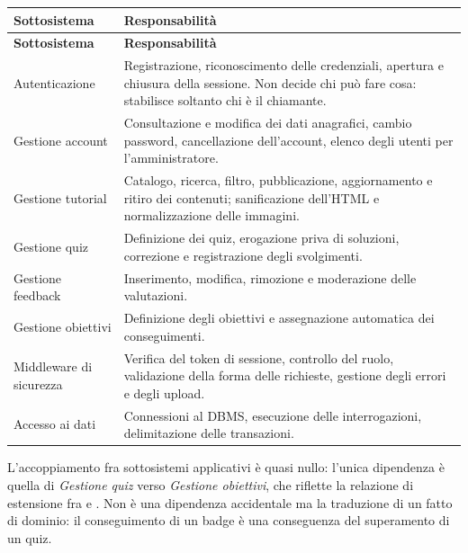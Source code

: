 \begin{longtable}{@{}L{3.4cm} L{11.0cm}@{}}
\toprule
\textbf{Sottosistema} & \textbf{Responsabilità} \\
\midrule
\endfirsthead
\toprule
\textbf{Sottosistema} & \textbf{Responsabilità} \\
\midrule
\endhead
\bottomrule
\endlastfoot

Autenticazione &
Registrazione, riconoscimento delle credenziali, apertura e chiusura della
sessione. Non decide chi può fare cosa: stabilisce soltanto chi è il
chiamante. \\

Gestione account &
Consultazione e modifica dei dati anagrafici, cambio password, cancellazione
dell'account, elenco degli utenti per l'amministratore. \\

Gestione tutorial &
Catalogo, ricerca, filtro, pubblicazione, aggiornamento e ritiro dei
contenuti; sanificazione dell'HTML e normalizzazione delle immagini. \\

Gestione quiz &
Definizione dei quiz, erogazione priva di soluzioni, correzione e
registrazione degli svolgimenti. \\

Gestione feedback &
Inserimento, modifica, rimozione e moderazione delle valutazioni. \\

Gestione obiettivi &
Definizione degli obiettivi e assegnazione automatica dei conseguimenti. \\

\midrule

Middleware di sicurezza &
Verifica del token di sessione, controllo del ruolo, validazione della forma
delle richieste, gestione degli errori e degli upload. \\

Accesso ai dati &
Connessioni al DBMS, esecuzione delle interrogazioni, delimitazione delle
transazioni. \\

\end{longtable}

L'accoppiamento fra sottosistemi applicativi è quasi nullo: l'unica dipendenza
è quella di \emph{Gestione quiz} verso \emph{Gestione obiettivi}, che riflette
la relazione di estensione fra  e . Non è una
dipendenza accidentale ma la traduzione di un fatto di dominio: il
conseguimento di un badge è una conseguenza del superamento di un quiz.

